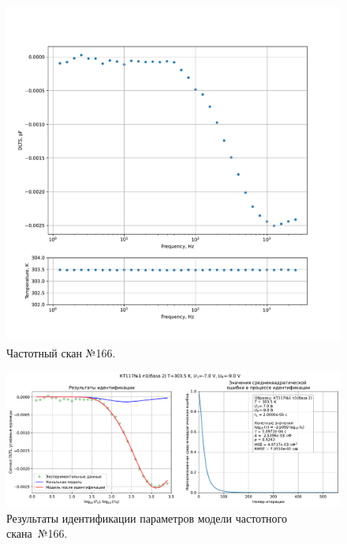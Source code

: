 \begin{figure}[!ht]
    \centering
    \includegraphics[width=1\textwidth]{../plots/КТ117№1_п1(база 2)_2500Гц-1Гц_1пФ_+30С_-7В-9В_50мВ_20мкс_шаг_0,1.pdf}
    \caption{Частотный скан №166.}
    \label{pic:frequency_scan_166}
\end{figure}

\begin{figure}[!ht]
    \centering
    \includegraphics[width=1\textwidth]{../plots/КТ117№1_п1(база 2)_2500Гц-1Гц_1пФ_+30С_-7В-9В_50мВ_20мкс_шаг_0,1_model.pdf}
    \caption{Результаты идентификации параметров модели частотного скана~№166.}
    \label{pic:frequency_scan_model166}
\end{figure}

\pagebreak


